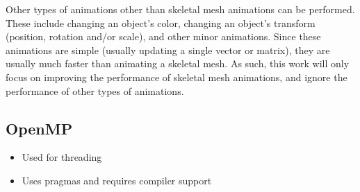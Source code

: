 Other types of animations other than skeletal mesh animations can be performed.
These include changing an object's color, changing an object's transform (position, rotation and/or scale), and other minor animations.
Since these animations are simple (usually updating a single vector or matrix), they are usually much faster than animating a skeletal mesh.
As such, this work will only focus on improving the performance of skeletal mesh animations, and ignore the performance of other types of animations.

\subsection{OpenMP}
\ifsummaries
\begin{itemize}
 \item Used for threading
 \item Uses pragmas and requires compiler support
\end{itemize}
\fi


%
